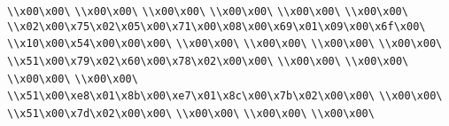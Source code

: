 \verb|\\x00\x00\|\newline
\verb|\\x00\x00\|\newline
\verb|\\x00\x00\|\newline
\verb|\\x00\x00\|\newline
\verb|\\x00\x00\|\newline
\verb|\\x00\x00\|\newline
\verb|\\x02\x00\x75\x02\x05\x00\x71\x00\x08\x00\x69\x01\x09\x00\x6f\x00\|\newline
\verb|\\x10\x00\x54\x00\x00\x00\|\newline
\verb|\\x00\x00\|\newline
\verb|\\x00\x00\|\newline
\verb|\\x00\x00\|\newline
\verb|\\x00\x00\|\newline
\verb|\\x51\x00\x79\x02\x60\x00\x78\x02\x00\x00\|\newline
\verb|\\x00\x00\|\newline
\verb|\\x00\x00\|\newline
\verb|\\x00\x00\|\newline
\verb|\\x00\x00\|\newline
\verb|\\x51\x00\xe8\x01\x8b\x00\xe7\x01\x8c\x00\x7b\x02\x00\x00\|\newline
\verb|\\x00\x00\|\newline
\verb|\\x51\x00\x7d\x02\x00\x00\|\newline
\verb|\\x00\x00\|\newline
\verb|\\x00\x00\|\newline
\verb|\\x00\x00\|\newline
